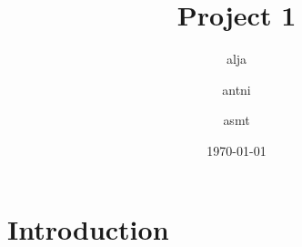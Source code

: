 \documentclass{article}
\title{Project 1}
\author{alja \and antni \and asmt}
\date{\today}
\begin{document}
\maketitle

\section{Introduction}
\end{document}

